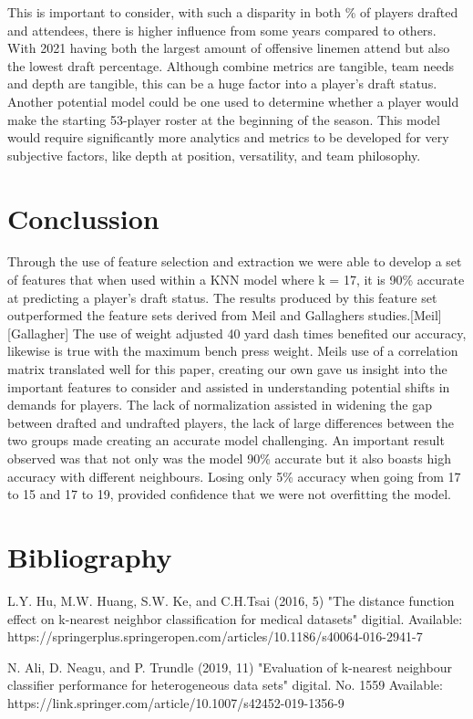 \documentclass[confrence]{IEEEtran}
\begin{document}
This is important to consider, with such a disparity in both \% of players drafted and attendees, there is higher influence from some years compared to others.
With 2021 having both the largest amount of offensive linemen attend but also the lowest draft percentage.
Although combine metrics are tangible, team needs and depth are tangible, this can be a huge factor into a player's draft status.
Another potential model could be one used to determine whether a player would make the starting 53-player roster at the beginning of the season.
This model would require significantly more analytics and metrics to be developed for very subjective factors, like depth at position, versatility, and team philosophy.
\section*{Conclussion}
Through the use of feature selection and extraction we were able to develop a set of features that when used within a KNN model where k = 17, it is 90\% accurate at predicting a player's draft status.
The results produced by this feature set outperformed the feature sets derived from Meil and Gallaghers studies.[Meil][Gallagher]
The use of weight adjusted 40 yard dash times benefited our accuracy, likewise is true with the maximum bench press weight.
Meils use of a correlation matrix translated well for this paper, creating our own gave us insight into the important features to consider and assisted in understanding potential shifts in demands for players.
The lack of normalization assisted in widening the gap between drafted and undrafted players, the lack of large differences between the two groups made creating an accurate model challenging.
An important result observed was that not only was the model 90\% accurate but it also boasts high accuracy with different neighbours.
Losing only 5\% accuracy when going from 17 to 15 and 17 to 19, provided confidence that we were not overfitting the model.

\section*{Bibliography}
L.Y. Hu, M.W. Huang, S.W. Ke, and C.H.Tsai (2016, 5) "The distance function effect on k-nearest neighbor classification for medical datasets" digitial. Available: https://springerplus.springeropen.com/articles/10.1186/s40064-016-2941-7

N. Ali, D. Neagu, and P. Trundle (2019, 11) "Evaluation of k-nearest neighbour classifier performance for heterogeneous data sets" digital. No. 1559  Available: https://link.springer.com/article/10.1007/s42452-019-1356-9
\end{document}

